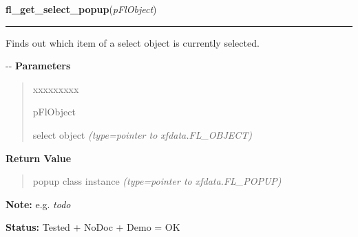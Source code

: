    \vspace{0.5ex}

\hspace{.8\funcindent}\begin{boxedminipage}{\funcwidth}

    \raggedright \textbf{fl\_get\_select\_popup}(\textit{pFlObject})

    \vspace{-1.5ex}

    \rule{\textwidth}{0.5\fboxrule}
\setlength{\parskip}{2ex}

Finds out which item of a select object is currently selected.

-{}-
\setlength{\parskip}{1ex}
      \textbf{Parameters}
      \vspace{-1ex}

      \begin{quote}
        \begin{Ventry}{xxxxxxxxx}

          \item[pFlObject]


select object
            {\it (type=pointer to xfdata.FL\_OBJECT)}

        \end{Ventry}

      \end{quote}

      \textbf{Return Value}
    \vspace{-1ex}

      \begin{quote}

popup class instance
      {\it (type=pointer to xfdata.FL\_POPUP)}

      \end{quote}

\textbf{Note:} 
e.g. \emph{todo}


\textbf{Status:} 
Tested + NoDoc + Demo = OK


    \end{boxedminipage}

    \label{xformslib:flselect:fl_set_select_popup}

    \vspace{0.5ex}

